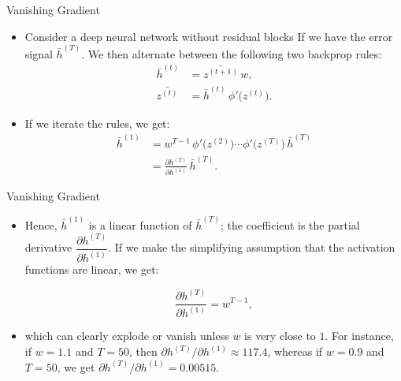 \documentclass[serif, aspectratio=169]{beamer}
\begin{document}
\begin{frame}{Vanishing Gradient}
	\begin{itemize}
		\item Consider a deep neural network without residual blocks
		If we have the error signal $\bar{h}^{(T)}$. We then alternate between the following two backprop rules:
		\begin{align}
			\bar{h}^{(t)} &= \bar{z^{(t+1)}}\, w, \\	
			\bar{z^{(t)}} &= \bar{h}^{(t)}\, \phi'\!\bigl(z^{(t)}\bigr).
		\end{align}


		\item If we iterate the rules, we get:
		\begin{align}
			\bar{h}^{(1)}
	  		&= w^{T-1}\,\phi'\!\bigl(z^{(2)}\bigr)\cdots \phi'\!\bigl(z^{(T)}\bigr)\,\bar{h}^{(T)} \\
			  &= \frac{\partial h^{(T)}}{\partial h^{(1)}}\,\bar{h}^{(T)}.
		\end{align}
				
		
	\end{itemize}
	\vspace{-0.5cm}
\end{frame}




\begin{frame}{Vanishing Gradient}
	\begin{itemize}


		\item Hence, $\bar{h}^{(1)}$ is a linear function of $\bar{h}^{(T)}$; the coefficient is the partial derivative $\dfrac{\partial h^{(T)}}{\partial h^{(1)}}$. If we make the simplifying assumption that the activation functions are linear, we get:
		
		\begin{equation}
			\frac{\partial h^{(T)}}{\partial h^{(1)}} = w^{T-1},
		\end{equation}


		\item which can clearly explode or vanish unless $w$ is very close to $1$. For instance, if $w=1.1$ and $T=50$, then $\partial h^{(T)}/\partial h^{(1)} \approx 117.4$, whereas if $w=0.9$ and $T = 50$, we get $\partial h^{(T)} / \partial h^{(1)} = 0.00515$.  


	\end{itemize}
	\vspace{-0.5cm}
\end{frame}
\end{document}
